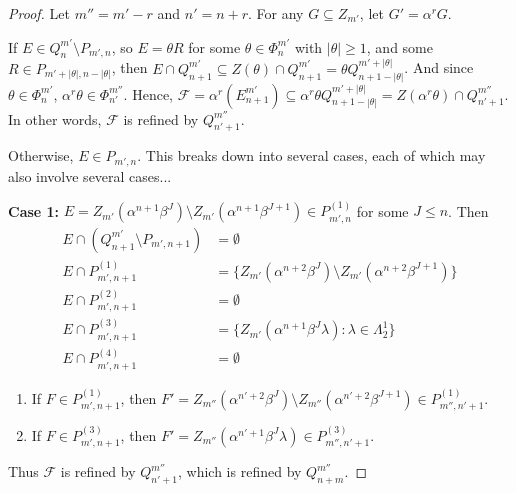 \documentclass[12pt]{amsart}
\newcommand{\sm}{\setminus}
\newcommand{\sse}{\subseteq}
\newcommand{\mc}[1]{\mathcal{#1}}
\newcommand{\emp}{\emptyset}
\newcommand{\al}{\alpha}
\newcommand{\be}{\beta}
\renewcommand{\th}{\theta}
\newcommand{\la}{\lambda}
\newcommand{\La}{\Lambda}
\theoremstyle{plain} %
\theoremstyle{definition} %
\begin{document}
\begin{proof}
    Let $m'' = m'-r$ and $n' = n+r$. For any $G \sse Z_{m'}$, let $G' = \al^r G$.
    
    If $E \in Q^{m'}_n \sm P_{m', n}$, so $E = \th R$ for some $\th \in \Phi_n^{m'}$ with $|\th| \ge 1$, and some $R \in P_{m'+|\th|, n-|\th|}$, then $E \cap Q_{n+1}^{m'} \sse Z(\th) \cap Q_{n+1}^{m'} = \th Q_{n+1 - |\th|}^{m'+|\th|}$. And since $\th \in \Phi_n^{m'}$, $\al^r \th \in \Phi_{n'}^{m''}$. Hence, $\mc{F} = \al^r (E^{m'}_{n+1}) \sse \al^r \th Q_{n+1 -|\th|}^{m'+|\th|} = Z(\al^r\th) \cap Q_{n'+1}^{m''}$. In other words, $\mc{F}$ is refined by $Q_{n'+1}^{m''}$.

    Otherwise, $E \in P_{m',n}$. This breaks down into several cases, each of which may also involve several cases...

    \textbf{Case 1:} $E = Z_{m'}(\al^{n+1}\be^J) \sm Z_{m'}(\al^{n+1}\be^{J+1}) \in P_{m',n}^{(1)}$ for some $J \leq n$. Then
    \begin{align*}
        E \cap (Q^{m'}_{n+1} \sm P_{m', n+1}) &= \emp\\
        E \cap P^{(1)}_{m',n+1} &= \{ Z_{m'}(\al^{n+2}\be^J) \sm Z_{m'}(\al^{n+2} \be^{J+1}) \}\\
        E \cap P^{(2)}_{m',n+1} &= \emp\\
        E \cap P^{(3)}_{m',n+1} &= \{ Z_{m'}(\al^{n+1}\be^J \la) : \la \in \La_2^1\} \\
        E \cap P^{(4)}_{m',n+1} &= \emp
    \end{align*}
    \begin{enumerate}
        \item If $F \in P^{(1)}_{m',n+1}$, then $F' = Z_{m''}(\al^{n'+2}\be^{J}) \sm Z_{m''}(\al^{n'+2}\be^{J+1}) \in P^{(1)}_{m'', n' + 1}$.

    \item If $F \in P^{(3)}_{m',n+1}$, then $F' = Z_{m''}(\al^{n'+1}\be^{J} \la) \in P^{(3)}_{m'', n' + 1}$.
    \end{enumerate}
    Thus $\mc{F}$ is refined by $Q^{m''}_{n'+1}$, which is refined by $Q^{m''}_{n+m}$.


\end{proof}
\end{document}
